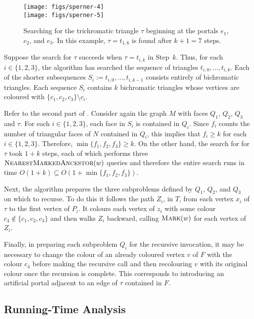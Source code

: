 \documentclass[kpfonts]{patmorin}
\let\ge\geqslant
\begin{document}
 \begin{figure}
   \begin{center}
     \texttt{[image: figs/sperner-4]} \\[1ex]
     \texttt{[image: figs/sperner-5]}
   \end{center}
   \caption{Searching for the trichromatic triangle $\tau$ beginning at the portals $e_1$, $e_2$, and $e_3$. In this example, $\tau=t_{1,6}$ is found after $k+1=7$ steps.}
 \end{figure}

Suppose the search for $\tau$ succeeds when $\tau=t_{i,k}$ in Step~$k$.  Thus, for each $i\in\{1,2,3\}$, the algorithm has searched the sequence of triangles $t_{i,0},\ldots,t_{i,k}$.  Each of the shorter subsequences $S_i:=t_{i,0},\ldots,t_{i,k-1}$ consists entirely of bichromatic triangles. Each sequence $S_i$ contains $k$ bichromatic triangles whose vertices are coloured with $\{c_1,c_2,c_3\}\setminus c_i$.

Refer to the second part of . Consider again the graph $M$ with faces $Q_1$, $Q_2$, $Q_3$ and $\tau$. For each $i\in\{1,2,3\}$, each face in $S_i$ is contained in $Q_i$.  Since $f_i$ counts the number of triangular faces of $N$ contained in $Q_i$, this implies that $f_i\ge k$ for each $i\in \{1,2,3\}$.  Therefore, $\min\{f_1,f_2,f_3\}\ge k$.  On the other hand, the search for for $\tau$ took $1+k$ steps, each of which performs three $\textsc{NearestMarkedAncestor}(w)$ queries and therefore the entire search runs in time $O(1+k) \subseteq O(1+\min\{f_1,f_2,f_3\})$.

Next, the algorithm prepares the three subproblems defined by $Q_1$, $Q_2$, and $Q_3$ on which to recurse.  To do this it follows the path $Z_i$, in $T$, from each vertex $x_i$ of $\tau$ to the first vertex of $P_i$.  It colours each vertex of $z_i$ with some colour $c_4\not\in\{c_1,c_2,c_3\}$ and then walks $Z_i$ backward, calling $\textsc{Mark}(w)$ for each vertex of $Z_i$.

Finally, in preparing each subproblem $Q_i$ for the recursive invocation, it may be necessary to change the colour of an already coloured vertex $v$ of $F$ with the colour $c_4$ before making the recursive call and then recolouring $v$ with its original colour once the recursion is complete.  This corresponds to introducing an artificial portal adjacent to an edge of $\tau$ contained in $F$.

\subsection{Running-Time Analysis}
\end{document}
